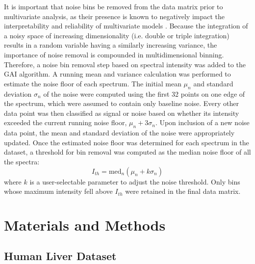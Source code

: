 \begin{doublespace}
It is important that noise bins be removed from the data matrix prior to
multivariate analysis, as their presence is known to negatively impact the
interpretability and reliability of multivariate models
\cite{halouska:jmr2006,bro:anmeth2014}. Because the integration of a
noisy space of increasing dimensionality (i.e. double or triple
integration) results in a random variable having a similarly increasing
variance, the importance of noise removal is compounded in multidimensional
binning. Therefore, a noise bin removal step based on spectral intensity was
added to the GAI algorithm. A running mean and variance calculation was
performed to estimate the noise floor of each spectrum. The initial mean
$\mu_n$ and standard deviation $\sigma_n$ of the noise were computed using the
first 32 points on one edge of the spectrum, which were assumed to contain only
baseline noise. Every other data point was then classified as signal or noise
based on whether its intensity exceeded the current running noise floor,
$\mu_n + 3 \sigma_n$. Upon inclusion of a new noise data point, the mean and
standard deviation of the noise were appropriately updated. Once the estimated
noise floor was determined for each spectrum in the dataset, a threshold for
bin removal was computed as the median noise floor of all the spectra:
\begin{equation}
I_{th} = \mathrm{med}_n (\mu_n + k \sigma_n)
\end{equation}
where $k$ is a user-selectable parameter to adjust the noise threshold. Only
bins whose maximum intensity fell above $I_{th}$ were retained in the final
data matrix.
\end{doublespace}

\section{Materials and Methods}

\subsection{Human Liver Dataset}

